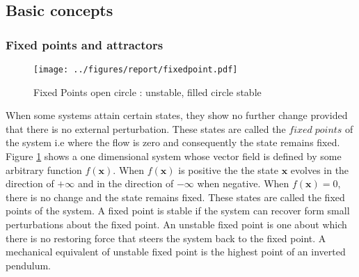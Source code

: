 \subsection{Basic concepts}
\subsubsection{Fixed points and attractors}
\begin{figure}
\centering
\texttt{[image: ../figures/report/fixedpoint.pdf]}
\caption[Fixed points]{Fixed Points open circle : unstable, filled circle stable}
\label{fixedpt}
\end{figure}
When some systems attain certain states, they show no further change provided that there is no external perturbation. These states are called the $fixed \; points$ of the system i.e where the flow is zero and consequently the state remains fixed.  Figure \ref{fixedpt} shows a one dimensional system whose vector field is defined by some arbitrary function $f(\mathbf{x})$. When $f(\mathbf{x})$ is positive the the state $\mathbf{x}$ evolves in the direction of $+ \infty$ and in the direction  of  $- \infty $ when negative. When $f(\mathbf{x}) = 0$, there is no change and the state remains fixed. These states are called the fixed points of the system. A fixed point is stable if the system can recover form small perturbations about the fixed point. An unstable fixed point is one about which there is no restoring force that steers the system back to the fixed point.  A mechanical equivalent of unstable fixed point is the highest point of an inverted pendulum.


